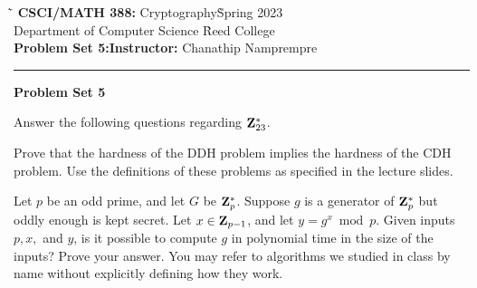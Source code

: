 \documentclass{exam}
\def\COURSENAME{Cryptography}
\def\COURSECODE{CSCI/MATH 388}
\def\YEAR{2023}
\begin{document}
\begin{tabbing}
  \`\=\kill
  \textbf{\COURSECODE:} \COURSENAME \` Spring \YEAR \\
  Department of Computer Science \` Reed College \\
  \textbf{Problem Set 5:}\` \textbf{Instructor:} Chanathip Namprempre
\end{tabbing}


\hrule

\vspace{.4in}

\begin{center}
\textbf{\Large Problem Set 5}
\end{center}


\vspace{.2in}

\begin{questions}

  \question Answer the following questions regarding $\mathbf{Z}_{23}^*$.

  

  \question Prove that the hardness of the DDH problem implies the hardness of the CDH problem. Use the definitions of these problems as specified in the lecture slides.

  \question Let $p$ be an odd prime, and let $G$ be $\mathbf{Z}_p^*$. Suppose $g$ is a generator of $\mathbf{Z}_p^*$ but oddly enough is kept secret. Let $x \in \mathbf{Z}_{p-1}$, and let $y = g^x \bmod p$. Given inputs $p, x,$ and $y$, is it possible to compute $g$ in polynomial time in the size of the inputs? Prove your answer. You may refer to algorithms we studied in class by name without explicitly defining how they work.


\end{questions}
\end{document}

